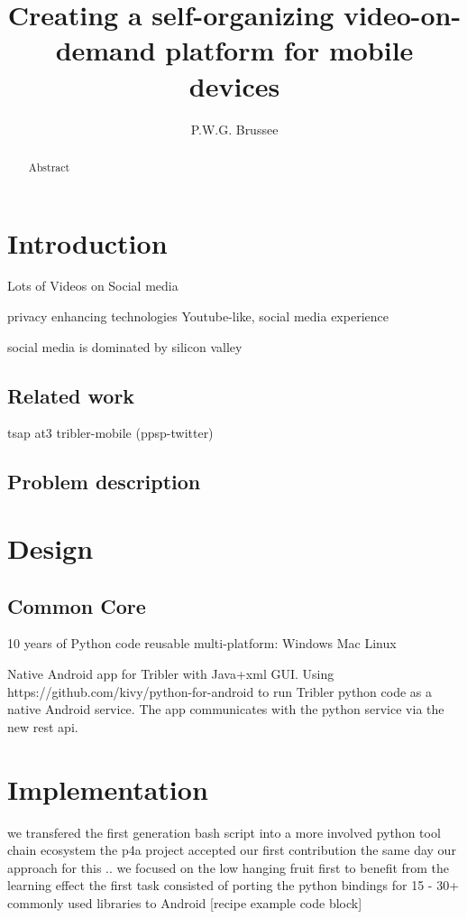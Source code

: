 \documentclass[]{report}
\title{Creating a self-organizing video-on-demand  platform for mobile devices}
\author{P.W.G. Brussee}
\begin{document}
\maketitle

\begin{abstract}
	Abstract
\end{abstract}


\chapter{Introduction}
Lots of Videos on Social media \cite{REF}

privacy enhancing technologies
Youtube-like, social media experience

social media is dominated by silicon valley


\section{Related work}
tsap
at3
tribler-mobile (ppsp-twitter)


\section{Problem description}



\chapter{Design}

\section{Common Core}
10 years of Python code 
reusable multi-platform: Windows Mac Linux


Native Android app for Tribler with Java+xml GUI.
Using https://github.com/kivy/python-for-android to run Tribler python code as a native Android service.
The app communicates with the python service via the new rest api.



\chapter{Implementation}


we transfered the first generation bash script into a more involved python tool chain ecosystem
the p4a project accepted our first contribution the same day
our approach for this .. we focused on the low hanging fruit first to benefit from the learning effect
the first task consisted of porting the python bindings for 15 - 30+ commonly used libraries to Android [recipe example code block]
\end{document}
